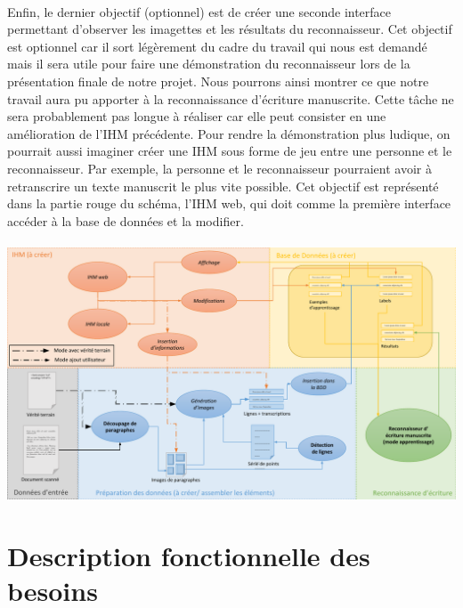\paragraph{}
Enfin, le dernier objectif (optionnel) est de créer une seconde interface permettant
d’observer les imagettes et les résultats du reconnaisseur. Cet objectif est optionnel
car il sort légèrement du cadre du travail qui nous est demandé mais il sera utile pour faire
une démonstration du reconnaisseur lors de la présentation finale de notre projet.
Nous pourrons ainsi montrer ce que notre travail aura pu apporter à la reconnaissance
d’écriture manuscrite. Cette tâche ne sera probablement pas longue à réaliser car elle peut
consister en une amélioration de l’IHM précédente. Pour rendre la démonstration plus
ludique, on pourrait aussi imaginer créer une IHM sous forme de jeu entre une personne
et le reconnaisseur. Par exemple, la personne et le reconnaisseur pourraient avoir à
retranscrire un texte manuscrit le plus vite possible. Cet objectif est représenté dans
la partie rouge du schéma, l'IHM web, qui doit comme la première interface
accéder à la base de données et la modifier.

\paragraph{}
\begin{mdframed}[frametitle={Schéma représentant les différents objectifs du projet}, innerbottommargin=10]
\begin{center}
\includegraphics[width=\linewidth]{schema.pdf}
\end{center}
\end{mdframed}

\newpage
\section{Description fonctionnelle des besoins}

